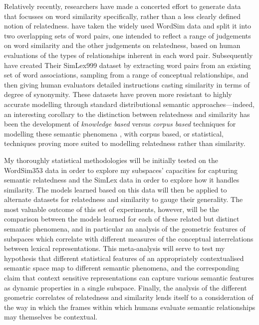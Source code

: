 Relatively recently, researchers have made a concerted effort to generate data that focusses on word similarity specifically, rather than a less clearly defined notion of relatedness.  \cite{AgirreEA2009} have taken the widely used WordSim data and split it into two overlapping sets of word pairs, one intended to reflect a range of judgements on word similarity and the other judgements on relatedness, based on human evaluations of the types of relationships inherent in each word pair.  Subsequently \cite{HillEA2015} have created Their SimLex999 dataset by extracting word pairs from an existing set of word associations, sampling from a range of conceptual relationships, and then giving human evaluators detailed instructions casting similarity in terms of degree of synonymity.  These datasets have proven more resistant to highly accurate modelling through standard distributional semantic approaches---indeed, an interesting corollary to the distinction between relatedness and similarity has been the development of \emph{knowledge based} versus \emph{corpus based} techniques for modelling these semantic phenomena \citep[see][for a discussion]{MihalceaEA2006,HassanEA2011}, with corpus based, or statistical, techniques proving more suited to modelling relatedness rather than similarity.

My thoroughly statistical methodologies will be initially tested on the WordSim353 data in order to explore my subspaces' capacities for capturing semantic relatedness and the SimLex data in order to explore how it handles similarity.  The models learned based on this data will then be applied to alternate datasets for relatedness and similarity to gauge their generality.  The most valuable outcome of this set of experiments, however, will be the comparison between the models learned for each of these related but distinct semantic phenomena, and in particular an analysis of the geometric features of subspaces which correlate with different measures of the conceptual interrelations between lexical representations.  This meta-analysis will serve to test my hypothesis that different statistical features of an appropriately contextualised semantic space map to different semantic phenomena, and the corresponding claim that context sensitive representations can capture various semantic features as dynamic properties in a single subspace.  Finally, the analysis of the different geometric correlates of relatedness and similarity lends itself to a consideration of the way in which the frames within which humans evaluate semantic relationships may themselves be contextual.

